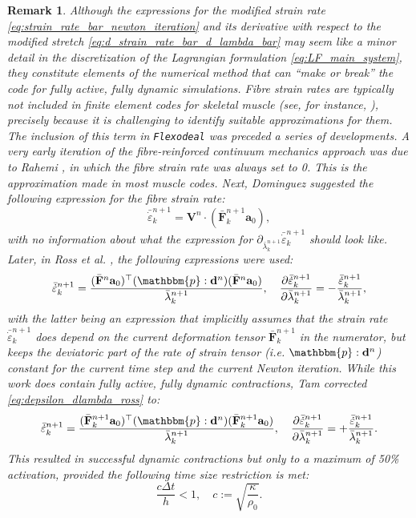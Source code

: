 \documentclass{sfuthesis}
\numberwithin{equation}{section}
\numberwithin{figure}{chapter}
\numberwithin{table}{chapter}
\newtheorem{remark}[theorem]{Remark}
\theoremstyle{definition}
\def\*#1{{\mathbf{#1}}} %
\newcommand{\pder}[2]{\dfrac{\partial #1}{\partial #2}}
\newcommand{\depsilon}{\dot{\varepsilon}}
\newcommand{\T}{\top}
\newcommand{\p}{\mathbbm{p}}
\begin{document}
\begin{remark}
Although the expressions for the modified strain rate \eqref{eq:strain_rate_bar_newton_iteration} and its derivative with respect to the modified stretch \eqref{eq:d_strain_rate_bar_d_lambda_bar} may seem like a minor detail in the discretization of the Lagrangian formulation \eqref{eq:LF_main_system}, they constitute elements of the numerical method that can ``make or break'' the code for fully active, fully dynamic simulations. 
Fibre strain rates are typically not included in finite element codes for skeletal muscle (see, for instance, \cite{BlemkerDelp2005, Oomens2003}), precisely because it is challenging to identify suitable approximations for them. The inclusion of this term in \texttt{Flexodeal} was preceded a series of developments. A very early iteration of the fibre-reinforced continuum mechanics approach was due to Rahemi \cite{Hadi}, in which the fibre strain rate was always set to 0. This is the approximation made in most muscle codes.
Next, Dominguez \cite{Seba} suggested the following expression for the fibre strain rate:
\begin{equation}
    \bar{\depsilon}_k^{n+1} = \*V^n \cdot (\bar{\*F}_k^{n+1} \*a_0),
\end{equation}
with no information about what the expression for $\partial_{\bar{\lambda}_k^{n+1}} \bar{\depsilon}_k^{n+1}$ should look like. Later, in Ross et al. \cite{Paper3_RossEtAl2021}, the following expressions were used:
\begin{equation} \label{eq:depsilon_dlambda_ross}
    \bar{\depsilon}_k^{n+1} = \dfrac{(\bar{\*F}^{n}\*a_0)^\T (\p : \*d^{n}) (\bar{\*F}^{n} \*a_0)}{\bar{\lambda}^{n+1}_k}, \quad \pder{\bar{\depsilon}_k^{n+1}}{\bar{\lambda}_k^{n+1}} = -\dfrac{\bar{\depsilon}_k^{n+1}}{\bar{\lambda}_k^{n+1}},
\end{equation}
with the latter being an expression that implicitly assumes that the strain rate $\bar{\depsilon}_k^{n+1}$ does depend on the current deformation tensor $\bar{\*F}_k^{n+1}$ in the numerator, but keeps the deviatoric part of the rate of strain tensor (i.e. $\p:\*d^n$) constant for the current time step and the current Newton iteration. While this work does contain fully active, fully dynamic contractions, Tam \cite{Cassidy} corrected \eqref{eq:depsilon_dlambda_ross} to:
\begin{equation}
    \bar{\depsilon}_k^{n+1} = \dfrac{(\bar{\*F}_k^{n+1}\*a_0)^\T (\p : \*d^{n}) (\bar{\*F}_k^{n+1} \*a_0)}{\bar{\lambda}^{n+1}_k}, \quad \pder{\bar{\depsilon}_k^{n+1}}{\bar{\lambda}_k^{n+1}} = +\dfrac{\bar{\depsilon}_k^{n+1}}{\bar{\lambda}_k^{n+1}}.
\end{equation}
This resulted in successful dynamic contractions but only to a maximum of 50\% activation, provided the following time size restriction is met:
\begin{equation}
    \dfrac{c \Delta t}{h} < 1, \quad c := \sqrt{\dfrac{\kappa}{\rho_0}}.
\end{equation}
\end{remark}
\end{document}
